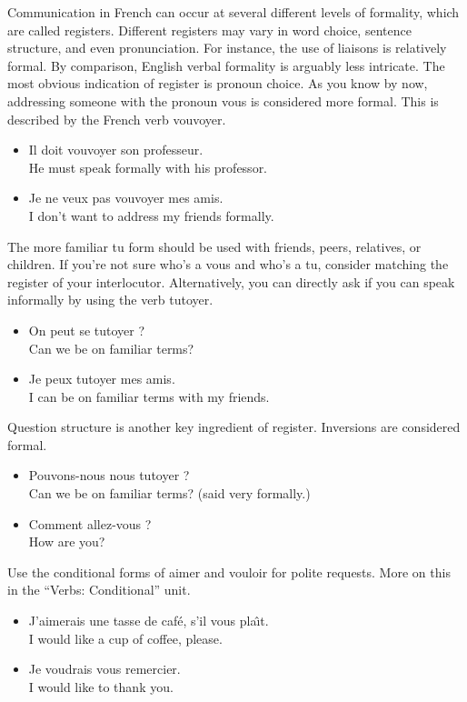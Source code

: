 Communication in French can occur at several different levels of formality, which are called registers. Different registers may vary in word choice, sentence structure, and even pronunciation. For instance, the use of liaisons is relatively formal. By comparison, English verbal formality is arguably less intricate.  The most obvious indication of register is pronoun choice. As you know by now, addressing someone with the pronoun vous is considered more formal. This is described by the French verb vouvoyer.

\begin{itemize}
  \item  Il doit vouvoyer son professeur. \\ He must speak formally with his professor.
	\item  Je ne veux pas vouvoyer mes amis. \\ I don't want to address my friends formally.
\end{itemize}

The more familiar tu form should be used with friends, peers, relatives, or children. If you're not sure who's a vous and who's a tu, consider matching the register of your interlocutor. Alternatively, you can directly ask if you can speak informally by using the verb tutoyer.

\begin{itemize}
  \item  On peut se tutoyer ? \\ Can we be on familiar terms?
	\item  Je peux tutoyer mes amis. \\ I can be on familiar terms with my friends.
\end{itemize}

Question structure is another key ingredient of register. Inversions are considered formal.

\begin{itemize}
  \item  Pouvons-nous nous tutoyer ? \\ Can we be on familiar terms? (said very formally.)
	\item  Comment allez-vous ? \\ How are you?
\end{itemize}

Use the conditional forms of aimer and vouloir for polite requests. More on this in the ``Verbs: Conditional'' unit.

\begin{itemize}
  \item  J'aimerais une tasse de caf{\'e}, s'il vous pla{\^\i}t. \\ I would like a cup of coffee, please.
	\item  Je voudrais vous remercier. \\ I would like to thank you.
\end{itemize}

